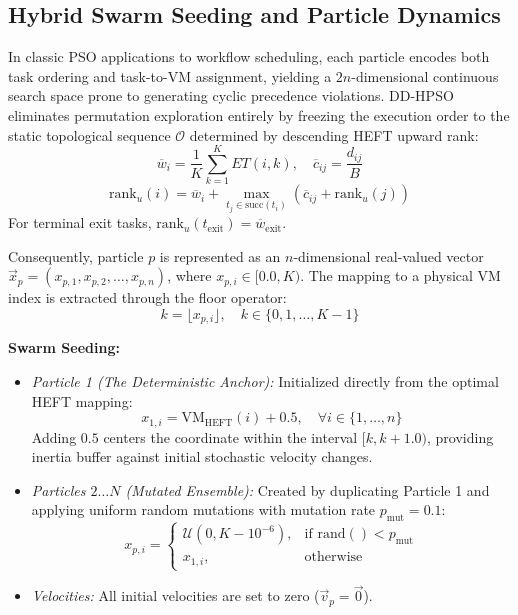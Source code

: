 \documentclass[journal]{IEEEtran}
\begin{document}
\subsection{Hybrid Swarm Seeding and Particle Dynamics}
In classic PSO applications to workflow scheduling, each particle encodes both task ordering and task-to-VM assignment, yielding a $2n$-dimensional continuous search space prone to generating cyclic precedence violations. DD-HPSO eliminates permutation exploration entirely by freezing the execution order to the static topological sequence $\mathcal{O}$ determined by descending HEFT upward rank:
\begin{equation}
\overline{w}_i = \frac{1}{K} \sum_{k=1}^{K} ET(i, k), \quad \overline{c}_{ij} = \frac{d_{ij}}{B}
\label{eq:mean_weights}
\end{equation}
\begin{equation}
\text{rank}_u(i) = \overline{w}_i + \max_{t_j \in \text{succ}(t_i)} \left( \overline{c}_{ij} + \text{rank}_u(j) \right)
\label{eq:ranku}
\end{equation}
For terminal exit tasks, $\text{rank}_u(t_{\text{exit}}) = \overline{w}_{\text{exit}}$.

Consequently, particle $p$ is represented as an $n$-dimensional real-valued vector $\vec{x}_p = (x_{p,1}, x_{p,2}, \dots, x_{p,n})$, where $x_{p,i} \in [0.0, K)$. The mapping to a physical VM index is extracted through the floor operator:
\begin{equation}
k = \lfloor x_{p,i} \rfloor, \quad k \in \{0, 1, \dots, K-1\}
\label{eq:discrete_map}
\end{equation}

\textbf{Swarm Seeding:}
\begin{itemize}
    \item \textit{Particle 1 (The Deterministic Anchor):} Initialized directly from the optimal HEFT mapping:
    \begin{equation}
    x_{1, i} = \text{VM}_{\text{HEFT}}(i) + 0.5, \quad \forall i \in \{1, \dots, n\}
    \label{eq:p1_seed}
    \end{equation}
    Adding $0.5$ centers the coordinate within the interval $[k, k+1.0)$, providing inertia buffer against initial stochastic velocity changes.
    \item \textit{Particles $2 \dots N$ (Mutated Ensemble):} Created by duplicating Particle 1 and applying uniform random mutations with mutation rate $p_{\text{mut}} = 0.1$:
    \begin{equation}
    x_{p, i} = \begin{cases} 
    \mathcal{U}(0, K - 10^{-6}), & \text{if } \text{rand}() < p_{\text{mut}} \\ 
    x_{1, i}, & \text{otherwise}
    \end{cases}
    \label{eq:pmut}
    \end{equation}
    \item \textit{Velocities:} All initial velocities are set to zero ($\vec{v}_p = \vec{0}$).
\end{itemize}
\end{document}
